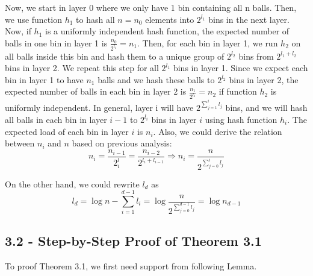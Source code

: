 \documentclass[a4paper, english]{paper}
\begin{document}
	Now, we start in layer 0 where we only have 1 bin containing all n balls. Then, we use function $h_1$ to hash all $n=n_0$ elements into $2^{l_1}$ bins in the next layer. Now, if $h_1$ is a uniformly independent hash function, the expected number of balls in one bin in layer 1 is $\frac{n_0}{2^{l_1}}=n_1$. Then, for each bin in layer 1, we run $h_2$ on all balls inside this bin and hash them to a unique group of $2^{l_2}$ bins from $2^{l_1+l_2}$ bins in layer 2. We repeat this step for all $2^{l_1}$ bins in layer 1. Since we expect each bin in layer 1 to have $n_1$ balls and we hash these balls to $2^{l_2}$ bins in layer 2, the expected number of balls in each bin in layer 2 is $\frac{n_1}{2^{l_1}}=n_2$ if function $h_2$ is uniformly independent. In general, layer i will have $2^{\sum_{j=1}^{i}l_j}$ bins, and we will hash all balls in each bin in layer $i-1$ to $2^{l_i}$ bins in layer $i$ using hash function $h_i$. The expected load of each bin in layer $i$ is $n_i$. Also, we could derive the relation between $n_i$ and $n$ based on previous analysis:
$$n_i = \frac{n_{i-1}}{2^l_i} = \frac{n_{i-2}}{2^{l_i+l_{i-1}}} \Rightarrow n_i = \frac{n}{2^{\sum_{j=0}^i l_j}}$$\par
 On the other hand, we could rewrite $l_d$ as $$l_d = \log n - \sum_{i=1}^{d-1}l_i = \log\frac{n}{2^{\sum_{j=0}^{d-1} l_j}} =\log n_{d-1}$$

 	\subsection{3.2 - Step-by-Step Proof of Theorem 3.1}
	To proof Theorem 3.1, we first need support from following Lemma.\\
	
\end{document}
